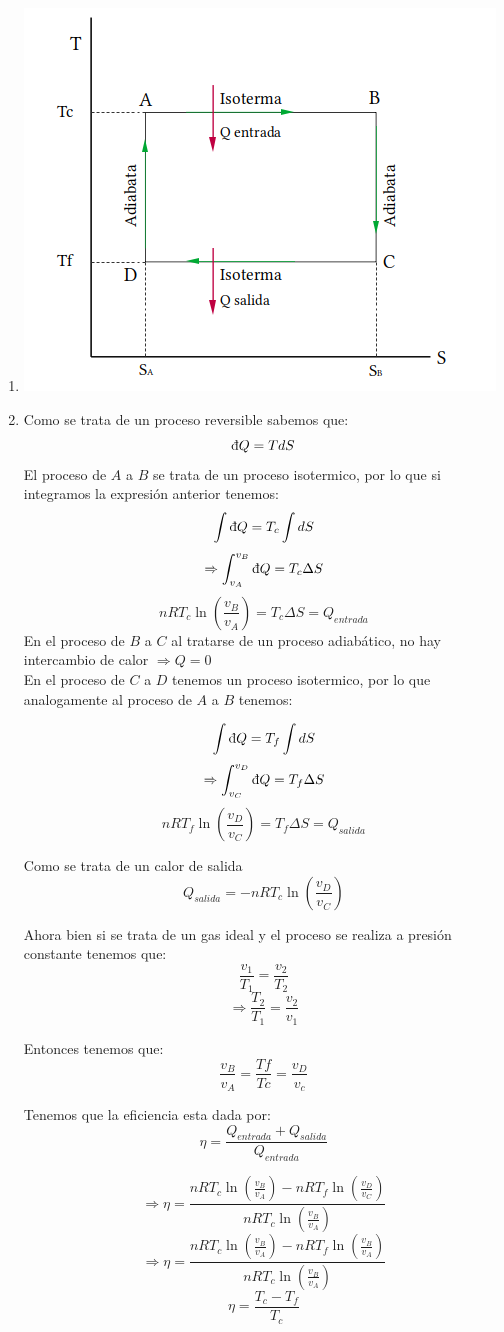 \begin{enumerate}
    \item  \includegraphics*[H]{T-S.png}
    \item  Como se trata de un proceso reversible  sabemos que:
    \[ \dbar Q =TdS \]
   El proceso de $A$ a $B$ se trata de un proceso isotermico, por lo que si integramos la expresión anterior tenemos:
   \[ \int \dbar Q =T_{c}\int dS \]
   \[ \Rightarrow \int _{v_A} ^{v_B} \dbar Q = T_{c} \Delta S\]
   \[nRT_c \ln \left( \frac{v_B}{v_A}\right) = T_{c}\Delta S = Q_{entrada}\]
    En el proceso de $B$ a $C$ al tratarse de un proceso adiabático, no hay intercambio de calor $\Rightarrow Q=0$\\

    En  el proceso de $C$ a $D$ tenemos un proceso isotermico, por lo que analogamente al proceso de $A$ a $B$ tenemos:

\[ \int \dbar Q =T_{f}\int dS \]
   \[ \Rightarrow \int _{v_C} ^{v_D} \dbar Q = T_{f} \Delta S\]
   \[nRT_f \ln \left( \frac{v_D}{v_C}\right) = T_{f}\Delta S = Q_{salida}\]

Como se trata de un calor de salida 
\[Q_{salida}=-nRT_c \ln \left( \frac{v_D}{v_C}\right)\]
  

   Ahora bien si  se trata de un gas ideal y el proceso se realiza a presión constante tenemos que:
   \[ \frac{v_1}{T_1}=\frac{v_2}{T_2}\]
   \[\Rightarrow \frac{T_2}{T_1}=\frac{v_2}{v_1}\]

Entonces tenemos que:
\[ \frac{v_B}{v_A}=\frac{Tf}{Tc}=\frac{v_D}{v_c}\]

Tenemos que la eficiencia esta dada por:
\[ \eta = \frac{Q_{entrada}+ Q_{salida}}{Q_{entrada}}\]

\[\Rightarrow  \eta = \frac{nRT_c \ln \left( \frac{v_B}{v_A}\right)-nRT_f \ln \left( \frac{v_D}{v_C}\right)}{nRT_c \ln \left( \frac{v_B}{v_A}\right)}\]
\[\Rightarrow  \eta = \frac{nRT_c \ln \left( \frac{v_B}{v_A}\right)-nRT_f \ln \left( \frac{v_B}{v_A}\right)}{nRT_c \ln \left( \frac{v_B}{v_A}\right)}\]
\[\eta =\frac{T_c-T_f}{T_c}\]





\end{enumerate}

